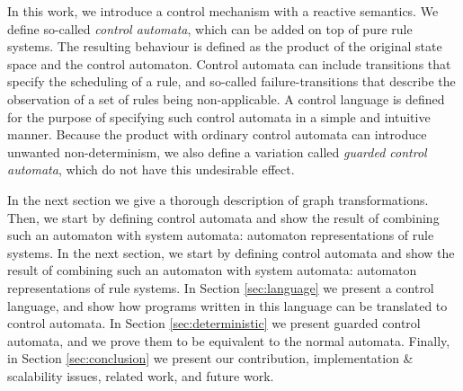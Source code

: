 In this work, we introduce a control mechanism with a reactive semantics. We define so-called \emph{control automata}, which can be added on top of pure rule systems. The resulting behaviour is defined as the product of the original state space and the control automaton.
Control automata can include transitions that specify the scheduling of a rule, and so-called failure-transitions that describe the observation of a set of rules being non-applicable. 
A control language is defined for the purpose of specifying such control automata in a simple and intuitive manner.
Because the product with ordinary control automata can introduce unwanted non-determinism, we also define a variation called \emph{guarded control automata}, which do not have this undesirable effect. 



\iffull
In the next section we give a thorough description of graph transformations. Then, we start by defining control automata and show the result of combining such an automaton with system automata: automaton representations of rule systems.
\else
In the next section, we start by defining control automata and show the result of combining such an automaton with system automata: automaton representations of rule systems.
\fi
In Section \ref{sec:language} we present a control language, and show how programs written in this language can be translated to control automata. In Section \ref{sec:deterministic} we present guarded control automata, and we prove them to be equivalent to the normal automata. Finally, in Section \ref{sec:conclusion} we present our contribution, implementation \& scalability issues, related work, and future work.
